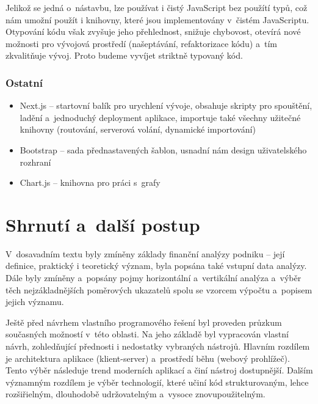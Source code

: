 Jelikož se jedná o~nástavbu, lze používat i čistý JavaScript bez použítí typů, což nám umožní použít i knihovny, které jsou implementovány v~čistém JavaScriptu. Otypování kódu však zvyšuje jeho přehlednost, snižuje chybovost, otevírá nové možnosti pro vývojová prostředí (našeptávání, refaktorizace kódu) a~tím zkvalitňuje vývoj. Proto budeme vyvíjet striktně typovaný kód. 


\subsubsection{Ostatní}
\begin{itemize}
	\item Next.js -- startovní balík pro urychlení vývoje, obsahuje skripty pro spouštění, ladění a~jednoduchý deployment aplikace, importuje také všechny užitečné knihovny (routování, serverová volání, dynamické importování)
	\item Bootstrap -- sada přednastavených šablon, usnadní nám design uživatelského rozhraní
	\item Chart.js -- knihovna pro práci s~grafy
\end{itemize} 






\section{Shrnutí a~další postup}
V~dosavadním textu byly zmíněny základy finanční analýzy podniku -- její definice, praktický i teoretický význam, byla popsána také vstupní data analýzy. Dále byly zmíněny a~popsány pojmy horizontální a~vertikální analýza a~výběr těch nejzákladnějších poměrových ukazatelů spolu se vzorcem výpočtu a~popisem jejich významu. 

Ještě před návrhem vlastního programového řešení byl proveden průzkum současných možností v~této oblasti. Na jeho základě byl vypracován vlastní návrh, zohledňující přednosti i nedostatky vybraných nástrojů. Hlavním rozdílem je architektura aplikace (klient-server) a~prostředí běhu (webový prohlížeč). Tento výběr následuje trend moderních aplikací a činí nástroj dostupnější. Dalším významným rozdílem je výběr technologií, které učiní kód strukturovaným, lehce rozšiřielným, dlouhodobě udržovatelným a~vysoce znovupoužitelným. 

